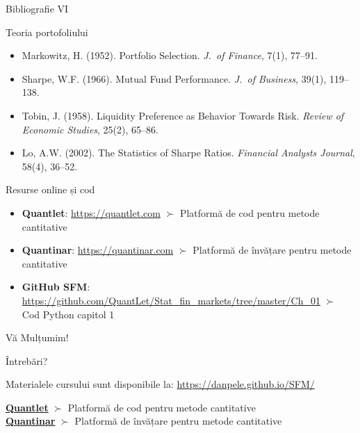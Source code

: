\documentclass[9pt, aspectratio=169, t]{beamer}
\theoremstyle{definition}
\newenvironment{cminipage}[1]{%
    \par\noindent\hfill\begin{minipage}{#1}\ignorespaces
}{%
    \end{minipage}\hfill\null\par
}
\begin{document}
\begin{frame}{Bibliografie VI}
    \begin{cminipage}{0.95\textwidth}
    \begin{block}{Teoria portofoliului}
        {\small
        \begin{itemize}\setlength{\itemsep}{0pt}
            \item Markowitz, H. (1952). Portfolio Selection. \textit{J.\ of Finance}, 7(1), 77--91.
            \item Sharpe, W.F. (1966). Mutual Fund Performance. \textit{J.\ of Business}, 39(1), 119--138.
            \item Tobin, J. (1958). Liquidity Preference as Behavior Towards Risk. \textit{Review of Economic Studies}, 25(2), 65--86.
            \item Lo, A.W. (2002). The Statistics of Sharpe Ratios. \textit{Financial Analysts Journal}, 58(4), 36--52.
        \end{itemize}
        }
    \end{block}

    \begin{exampleblock}{Resurse online și cod}
        {\small
        \begin{itemize}\setlength{\itemsep}{0pt}
            \item \textbf{Quantlet}: \url{https://quantlet.com} $\succ$ Platformă de cod pentru metode cantitative
            \item \textbf{Quantinar}: \url{https://quantinar.com} $\succ$ Platformă de învățare pentru metode cantitative
            \item \textbf{GitHub SFM}: \url{https://github.com/QuantLet/Stat_fin_markets/tree/master/Ch_01} $\succ$ Cod Python capitol 1
        \end{itemize}
        }
    \end{exampleblock}
    \end{cminipage}
\end{frame}

\begin{frame}{}
    \begin{cminipage}{0.95\textwidth}
    \centering
    \vspace{1cm}

    \Huge\textcolor{MainBlue}{Vă Mulțumim!}

    \vspace{0.8cm}

    \Large Întrebări?

    \vspace{1cm}

    \normalsize
    Materialele cursului sunt disponibile la: \url{https://danpele.github.io/SFM/}

    \vspace{0.3cm}

    \href{https://quantlet.com}{\textbf{Quantlet}} $\succ$ Platformă de cod pentru metode cantitative\\[3pt]
    \href{https://quantinar.com}{\textbf{Quantinar}} $\succ$ Platformă de învățare pentru metode cantitative
    \end{cminipage}
\end{frame}
\end{document}
